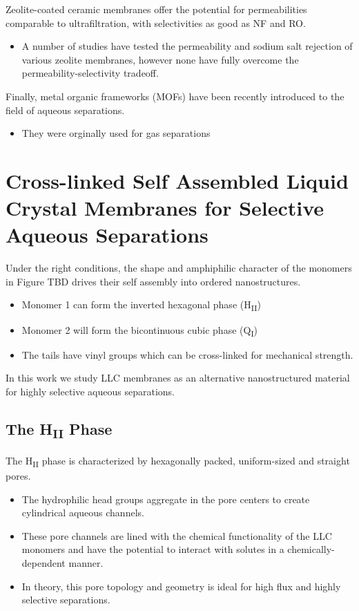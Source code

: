   Zeolite-coated ceramic membranes offer the potential for permeabilities
  comparable to ultrafiltration, with selectivities as good as NF and RO.%
  \begin{itemize}
	\item A number of studies have tested the permeability and sodium salt rejection
    of various zeolite membranes, however none have fully overcome the
    permeability-selectivity tradeoff.~\cite{pendergast_review_2011,auerbach_handbook_2003,li_novel_2007}
  \end{itemize}

  Finally, metal organic frameworks (MOFs) have been recently introduced to the
  field of aqueous separations.
  \begin{itemize}
    \item They were orginally used for gas separations
  \end{itemize}
  
  \section{Cross-linked Self Assembled Liquid Crystal Membranes for Selective Aqueous Separations}
  
  Under the right conditions, the shape and amphiphilic character of the monomers in 
  Figure TBD drives their self assembly into ordered nanostructures.
  \begin{itemize}
    \item Monomer 1 can form the inverted hexagonal phase (H\textsubscript{II})
    \item Monomer 2 will form the bicontinuous cubic phase (Q\textsubscript{I})
    \item The tails have vinyl groups which can be cross-linked for mechanical strength.
  \end{itemize}
  
  
  In this work we study LLC membranes as an alternative nanostructured material for 
  highly selective aqueous separations.
  
  \subsection{The H\textsubscript{II} Phase}
   
  The H\textsubscript{II} phase is characterized by hexagonally packed, uniform-sized
  and straight pores.
  \begin{itemize}
    \item The hydrophilic head groups aggregate in the pore centers to create
    cylindrical aqueous channels. 
    \item These pore channels are lined with the chemical functionality of the LLC monomers
    and have the potential to interact with solutes in a chemically-dependent manner.
    \item In theory, this pore topology and geometry is ideal for high flux and 
    highly selective separations.
  \end{itemize}
  
